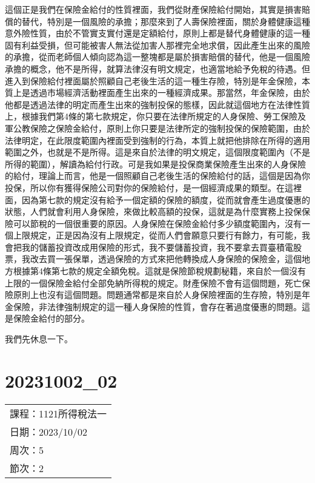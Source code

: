 \documentclass[]{ctexbook}
\begin{document}
這個正是我們在保險金給付的性質裡面，我們從財產保險給付開始，其實是損害賠償的替代，特別是一個風險的承擔；那麼來到了人壽保險裡面，關於身體健康這種意外險性質，由於不管實支實付還是定額給付，原則上都是替代身體健康的這一種固有利益受損，但可能被害人無法從加害人那裡完全地求償，因此產生出來的風險的承擔，從而老師個人傾向認為這一整塊都是屬於損害賠償的替代，他是一個風險承擔的概念，他不是所得，就算法律沒有明文規定，也適當地給予免稅的待遇。但進入到保險給付裡面屬於照顧自己老後生活的這一種生存險，特別是年金保險，本質上是透過市場經濟活動裡面產生出來的一種經濟成果。那當然，年金保險，由於他都是透過法律的明定而產生出來的強制投保的態樣，因此就這個地方在法律性質上，根據我們第4條的第七款規定，你只要在法律所規定的人身保險、勞工保險及軍公教保險之保險金給付，原則上你只要是法律所定的強制投保的保險範圍，由於法律明定，在此限度範圍內裡面受到強制的行為，本質上就把他排除在所得的適用範圍之外，也就是不是所得。這是來自於法律的明文規定，這個限度範圍內（不是所得的範圍），解讀為給付行政。可是我如果是投保商業保險產生出來的人身保險的給付，理論上而言，他是一個照顧自己老後生活的保險給付的話，這個是因為你投保，所以你有獲得保險公司對你的保險給付，是一個經濟成果的類型。在這裡面，因為第七款的規定沒有給予一個定額的保險的額度，從而就會產生過度優惠的狀態，人們就會利用人身保險，來做比較高額的投保，這就是為什麼實務上投保保險可以節稅的一個很重要的原因。人身保險在保險金給付多少額度範圍內，沒有一個上限規定，正是因為沒有上限規定，從而人們會願意只要行有餘力，有可能，我會把我的儲蓄投資改成用保險的形式，我不要儲蓄投資，我不要拿去買臺積電股票，我改去買一張保單，透過保險的方式來把他轉換成人身保險的保險金，這個地方根據第4條第七款的規定全額免稅。這就是保險節稅規劃秘籍，來自於一個沒有上限的一個保險金給付全部免納所得稅的規定。財產保險不會有這個問題，死亡保險原則上也沒有這個問題。問題通常都是來自於人身保險裡面的生存險，特別是年金保險，非法律強制規定的這一種人身保險的性質，會存在著過度優惠的問題。這是保險金給付的部分。

我們先休息一下。

\hypertarget{section-10}{%
\chapter{20231002\_02}\label{section-10}}

\begin{longtable}[]{@{}l@{}}
\toprule()
\endhead
課程：1121所得稅法一 \\
日期：2023/10/02 \\
周次：5 \\
節次：2 \\
\bottomrule()
\end{longtable}
\end{document}
